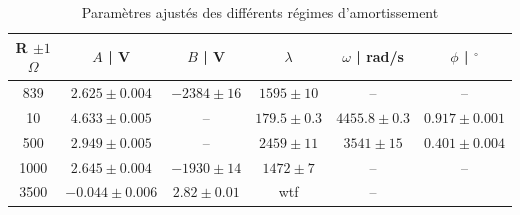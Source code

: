\documentclass[preview]{standalone}
\begin{document}
\setcounter{table}{2}
\begin{table}[h!]
\centering
\label{tab:fits}
\renewcommand{\arraystretch}{1.2}
\begin{tabular}{|c|c|c|c|c|c|}
\hline
R $\pm 1$ $\Omega$ & $A$ | V & $B$ | V & $\lambda$ & $\omega$ | rad/s & $\phi$ | $^\circ$ \\
\hline
839 &
$2.625 \pm 0.004$ &
$-2384 \pm 16$ &
$1595 \pm 10$ &
-- & -- \\

10   & 
$4.633 \pm 0.005$ &
-- &
$179.5 \pm 0.3$ &
$4455.8 \pm 0.3$ &
$0.917 \pm 0.001$ \\

500   & 
$2.949 \pm 0.005$ &
-- &
$2459 \pm 11$ &
$3541 \pm 15$ &
$0.401 \pm 0.004$ \\

1000   &
$2.645 \pm 0.004$ &
$-1930 \pm 14$ &
$1472 \pm 7$ &
-- & -- \\

3500   &
$-0.044 \pm 0.006$ &
$2.82 \pm 0.01$ &
wtf &
-- \\
\hline
\end{tabular}
\caption{Paramètres ajustés des différents régimes d'amortissement}
\end{table}



\end{document}
